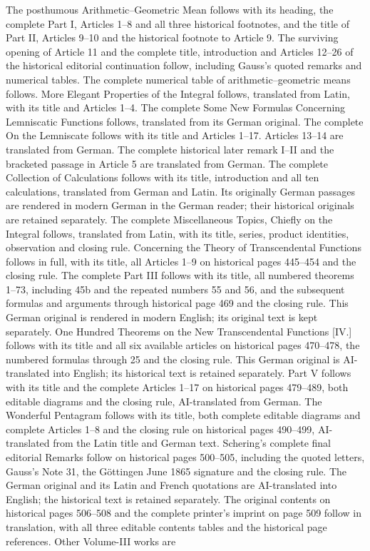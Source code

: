 \par\endgroup\clearpage\thispagestyle{empty}\medskip
\begingroup\fontsize{9.5}{10.2}\selectfont\raggedright
The posthumous Arithmetic–Geometric Mean follows with its heading, the complete Part I, Articles 1–8 and all three historical footnotes, and the title of Part II, Articles 9–10 and the historical footnote to Article 9. The surviving opening of Article 11 and the complete title, introduction and Articles 12–26 of the historical editorial continuation follow, including Gauss’s quoted remarks and numerical tables. The complete numerical table of arithmetic–geometric means follows. More Elegant Properties of the Integral follows, translated from Latin, with its title and Articles 1–4. The complete Some New Formulas Concerning Lemniscatic Functions follows, translated from its German original. The complete On the Lemniscate follows with its title and Articles 1–17. Articles 13–14 are translated from German. The complete historical later remark I–II and the bracketed passage in Article 5 are translated from German. The complete Collection of Calculations follows with its title, introduction and all ten calculations, translated from German and Latin. Its originally German passages are rendered in modern German in the German reader; their historical originals are retained separately. The complete Miscellaneous Topics, Chiefly on the Integral follows, translated from Latin, with its title, series, product identities, observation and closing rule. Concerning the Theory of Transcendental Functions follows in full, with its title, all Articles 1--9 on historical pages 445--454 and the closing rule. The complete Part III follows with its title, all numbered theorems 1--73, including 45b and the repeated numbers 55 and 56, and the subsequent formulas and arguments through historical page 469 and the closing rule. This German original is rendered in modern English; its original text is kept separately. One Hundred Theorems on the New Transcendental Functions [IV.] follows with its title and all six available articles on historical pages 470--478, the numbered formulas through 25 and the closing rule. This German original is AI-translated into English; its historical text is retained separately. Part V follows with its title and the complete Articles 1--17 on historical pages 479--489, both editable diagrams and the closing rule, AI-translated from German. The Wonderful Pentagram follows with its title, both complete editable diagrams and complete Articles 1--8 and the closing rule on historical pages 490--499, AI-translated from the Latin title and German text. Schering’s complete final editorial Remarks follow on historical pages 500--505, including the quoted letters, Gauss’s Note 31, the Göttingen June 1865 signature and the closing rule. The German original and its Latin and French quotations are AI-translated into English; the historical text is retained separately. The original contents on historical pages 506--508 and the complete printer’s imprint on page 509 follow in translation, with all three editable contents tables and the historical page references. Other Volume-III works are 